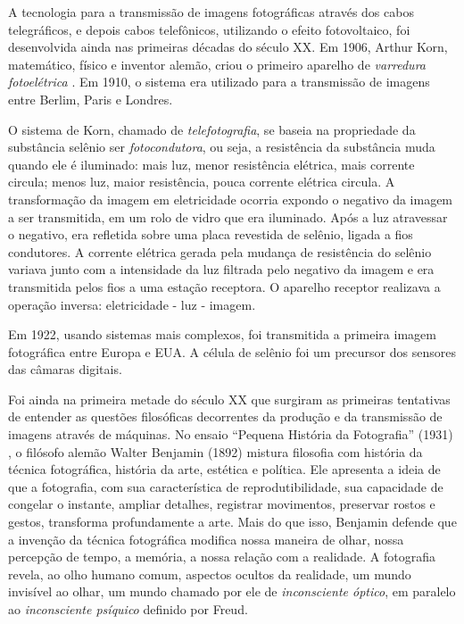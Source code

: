 \documentclass{hipatia}
\begin{document}
A tecnologia para a transmissão de imagens fotográficas através dos cabos telegráficos, e depois cabos telefônicos, utilizando o efeito fotovoltaico, foi desenvolvida ainda nas primeiras décadas do século XX. Em 1906, Arthur Korn, matemático, físico e inventor alemão, criou o primeiro aparelho de \textit{varredura fotoelétrica} \cite{Korn1902}. Em 1910, o sistema era utilizado para a transmissão de imagens entre Berlim, Paris e Londres. 

O sistema de Korn, chamado de \textit{telefotografia}, se baseia na propriedade da substância selênio ser \textit{fotocondutora}, ou seja, a resistência da substância muda quando ele é iluminado: mais luz, menor resistência elétrica, mais corrente circula; menos luz, maior resistência, pouca corrente elétrica circula. A transformação da imagem em eletricidade ocorria expondo o negativo da imagem a ser transmitida, em um rolo de vidro que era iluminado. Após a luz atravessar o negativo, era refletida sobre uma placa revestida de selênio, ligada a fios condutores. A corrente elétrica gerada pela mudança de resistência do selênio variava junto com a intensidade da luz filtrada pelo negativo da imagem e era transmitida pelos fios a uma estação receptora. O aparelho receptor realizava a operação inversa: eletricidade - luz - imagem. 

Em 1922, usando sistemas mais complexos, foi transmitida a primeira imagem fotográfica entre Europa e EUA. A célula de selênio foi um precursor dos sensores das câmaras digitais. 

Foi ainda na primeira metade do século XX que surgiram as primeiras tentativas de entender as questões filosóficas decorrentes da produção e da transmissão de imagens através de máquinas. No ensaio ``Pequena História da Fotografia'' (1931) \cite{Benjamin2017}, o filósofo alemão Walter Benjamin (1892) mistura filosofia com história da técnica fotográfica, história da arte, estética e política. Ele apresenta a ideia de que a fotografia, com sua característica de reprodutibilidade, sua capacidade de congelar o instante, ampliar detalhes, registrar movimentos, preservar rostos e gestos, transforma profundamente a arte. Mais do que isso, Benjamin defende que a invenção da técnica fotográfica modifica nossa maneira de olhar, nossa percepção de tempo, a memória, a nossa relação com a realidade. A fotografia revela, ao olho humano comum, aspectos ocultos da realidade, um mundo invisível ao olhar, um mundo chamado por ele de \textit{inconsciente óptico}, em paralelo ao \textit{inconsciente psíquico} definido por Freud.
\end{document}
